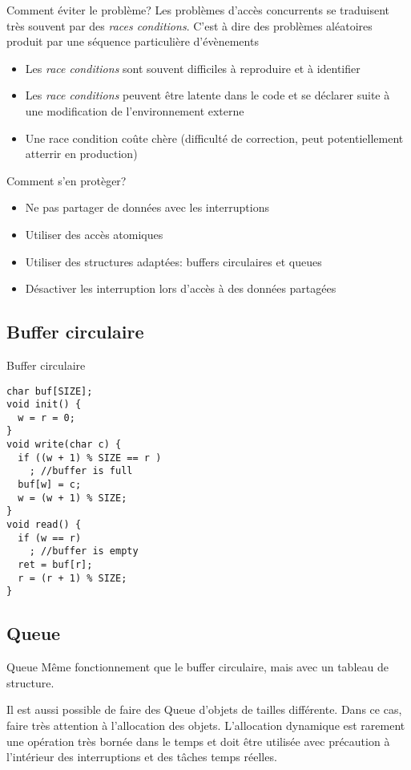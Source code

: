 \begin{frame}{Comment éviter le problème?}
  Les problèmes d'accès concurrents se traduisent très souvent par des
  \emph{races  conditions}.   C'est à  dire  des problèmes  aléatoires
  produit par une séquence particulière d'évènements
  \begin{itemize} 
  \item   Les  \emph{race  conditions}   sont  souvent   difficiles  à
    reproduire et à identifier
  \item Les  \emph{race conditions} peuvent être latente  dans le code
    et se déclarer suite à une modification de l'environnement externe
  \item Une race condition coûte chère (difficulté de correction, peut
    potentiellement atterrir en production)
  \end{itemize} 
  Comment s'en protèger?
  \begin{itemize} 
  \item  Ne  pas  partager de données avec les interruptions
  \item Utiliser des accès atomiques
  \item  Utiliser  des  structures  adaptées: buffers  circulaires  et
    queues
  \item  Désactiver  les  interruption  lors  d'accès  à  des  données
    partagées
  \end{itemize} 
\end{frame} 

\subsection{Buffer circulaire}

\begin{frame}[fragile]{Buffer circulaire}
  \begin{lstlisting}
char buf[SIZE]; 
void init() {
  w = r = 0;
}
void write(char c) {
  if ((w + 1) % SIZE == r )
    ; //buffer is full
  buf[w] = c;
  w = (w + 1) % SIZE;
}
void read() {
  if (w == r)
    ; //buffer is empty
  ret = buf[r];
  r = (r + 1) % SIZE;
}
  \end{lstlisting} 
\end{frame} 

\subsection{Queue}

\begin{frame}{Queue}
  Même fonctionnement  que le buffer circulaire, mais  avec un tableau
  de structure.  

  Il  est  aussi possible  de  faire  des  Queue d'objets  de  tailles
  différente.  Dans  ce cas, faire  très attention à  l'allocation des
  objets.   L'allocation  dynamique est  rarement  une opération  très
  bornée  dans  le temps  et  doit  être  utilisée avec  précaution  à
  l'intérieur des interruptions et des tâches temps réelles.
\end{frame} 

